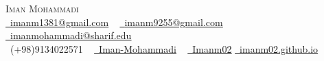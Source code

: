 \documentclass[letterpaper,11pt]{article}
\begin{document}
	
	
	\begin{center}
		{\Huge \scshape Iman Mohammadi} \\ \vspace{1pt}
		 \href{mailto:imanm1381@gmail.com}{\raisebox{-0.2\height}\faEnvelope\  \underline{imanm1381@gmail.com}} ~ 
		\href{mailto:imanm9255@gmail.com}{\raisebox{-0.2\height}\faEnvelope\  \underline{imanm9255@gmail.com}} ~ 
		\href{mailto:imanmohammadi@sharif.edu}{\raisebox{-0.2\height}\faEnvelope\  \underline{imanmohammadi@sharif.edu}} ~  \\
		\small \raisebox{-0.1\height}\faPhone\ (+98)9134022571 ~
		\href{https://www.linkedin.com/in/imanmohammadi02/}{\raisebox{-0.2\height}\faLinkedin\ \underline{Iman-Mohammadi}}  ~
		\href{https://github.com/Imanm02}{\raisebox{-0.2\height}\faGithub\ \underline{Imanm02}}
		\href{https://imanm02.github.io}{\raisebox{-0.2\height}\faPager \ \underline{imanm02.github.io}}
		\vspace{-8pt}
	\end{center}
	
	
	
	
	
	

	

	
	\vspace{-16pt}
	
	
	
	
	\vspace{-5pt}

	



	
	
	
\vspace{-30pt}
	
	
\end{document}
